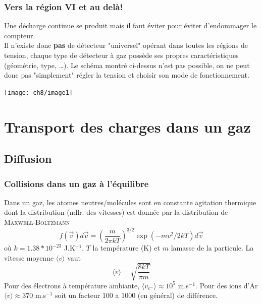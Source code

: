 	\subsubsection{Vers la région VI et au delà!}
	Une décharge continue se produit mais il faut éviter pour éviter d'endommager le compteur.\\
	
	Il n'existe donc \textbf{pas} de détecteur "universel" opérant dans toutes les régions de 
	tension, chaque type de détecteur à gaz possède ses propres caractéristiques (géométrie, type, 
	\dots). Le schéma montré ci-dessus n'est pas possible, on ne peut donc pas "simplement" régler 
	la tension et choisir son mode de fonctionnement.
	
	\begin{center}
	\texttt{[image: ch8/image1]}
	\end{center}
	
\section{Transport des charges dans un gaz}%
	\subsection{Diffusion}
		\subsubsection{Collisions dans un gaz à l'équilibre}
		Dans un gaz, les atomes neutres/molécules sont en constante agitation thermique dont la
		distribution (ndlr. des vitesses) est donnée par la distribution de 
		\textsc{Maxwell-Boltzmann}
		\begin{equation}
		f(\vec{v})d\vec{v}=\left( \frac{m}{2\pi kT}\right)^{3/2}\exp{(-mv^2/2kT)}d\vec{v}
		\end{equation}
		où $k=1.38*10^{-23}$ J.K$^{-1}$, $T$ la température (K) et $m$ lamasse de la particule. La
		vitesse moyenne $\langle v\rangle$ vaut
		\begin{equation}
		\langle v\rangle=\sqrt{\frac{8kT}{\pi m}}
		\end{equation}
		Pour des électrons à température ambiante, $\langle v_{e^-}\rangle \approx 10^5$ m.s$^{-1}$.
		Pour des ions d'Ar $\langle v\rangle \approx 370$ m.s$^{-1}$ soit un facteur 100 a 1000 
		(en général) de différence.
		
		
